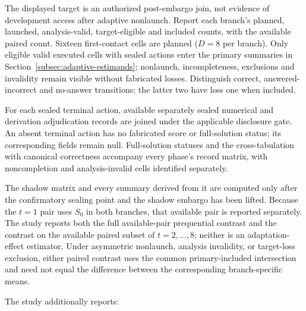 \documentclass[10pt]{article} %
\providecommand{\1}{\mathbf{1}}  %
\theoremstyle{remark}
\theoremstyle{definition}
\begin{document}
The displayed target is an authorized post-embargo join, not evidence of
development access after adaptive nonlaunch. Report each branch's planned,
launched, analysis-valid, target-eligible and included counts, with the
available paired count. Sixteen first-contact cells are planned ($D=8$ per
branch). Only eligible valid executed cells with sealed actions enter the
primary summaries in Section~\ref{subsec:adaptive-estimands}; nonlaunch,
incompleteness, exclusions and invalidity remain visible without fabricated
losses. Distinguish correct, answered-incorrect and no-answer transitions;
the latter two have loss one when included.

For each sealed terminal action, available separately sealed numerical
and derivation adjudication records are joined under the applicable
disclosure gate. An absent terminal action has no fabricated score or
full-solution status; its corresponding fields remain null. Full-solution
statuses and the cross-tabulation
with canonical correctness accompany every phase's record matrix,
with noncompletion and analysis-invalid cells identified separately.

The shadow matrix and every summary derived from it are computed only after the confirmatory sealing point and the shadow embargo has been lifted. Because the $t=1$ pair uses $S_0$ in both branches, that available pair is reported separately. The study reports both the full available-pair prequential contrast and the contrast on the available paired subset of $t=2,\ldots,8$; neither is an adaptation-effect estimator. Under asymmetric nonlaunch, analysis invalidity, or target-loss exclusion, either paired contrast uses the common primary-included intersection and need not equal the difference between the corresponding branch-specific means.

The study additionally reports:
\end{document}
